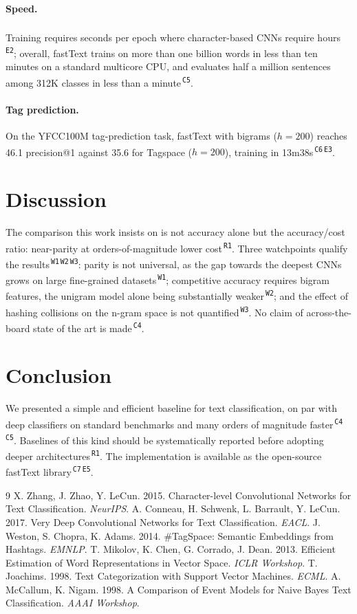 \documentclass[10pt,twocolumn]{article}
\newcommand{\anch}[1]{\textsuperscript{\,\textcolor{anchor}{\tiny\texttt{#1}}}}
\begin{document}
\paragraph{Speed.}
Training requires seconds per epoch where character-based CNNs require hours\anch{E2}; overall, fastText trains on more than one billion words in less than ten minutes on a standard multicore CPU, and evaluates half a million sentences among 312K classes in less than a minute\anch{C5}.

\paragraph{Tag prediction.}
On the YFCC100M tag-prediction task, fastText with bigrams ($h{=}200$) reaches 46.1 precision@1 against 35.6 for Tagspace ($h{=}200$), training in 13m38s\anch{C6}\anch{E3}.

\section{Discussion}
The comparison this work insists on is not accuracy alone but the accuracy/cost ratio: near-parity at orders-of-magnitude lower cost\anch{R1}. Three watchpoints qualify the results\anch{W1}\anch{W2}\anch{W3}: parity is not universal, as the gap towards the deepest CNNs grows on large fine-grained datasets\anch{W1}; competitive accuracy requires bigram features, the unigram model alone being substantially weaker\anch{W2}; and the effect of hashing collisions on the n-gram space is not quantified\anch{W3}. No claim of across-the-board state of the art is made\anch{C4}.

\section{Conclusion}
We presented a simple and efficient baseline for text classification, on par with deep classifiers on standard benchmarks and many orders of magnitude faster\anch{C4}\anch{C5}. Baselines of this kind should be systematically reported before adopting deeper architectures\anch{R1}. The implementation is available as the open-source fastText library\anch{C7}\anch{E5}.

\begin{thebibliography}{9}\small
{} X. Zhang, J. Zhao, Y. LeCun. 2015. Character-level Convolutional Networks for Text Classification. \emph{NeurIPS}.
 A. Conneau, H. Schwenk, L. Barrault, Y. LeCun. 2017. Very Deep Convolutional Networks for Text Classification. \emph{EACL}.
 J. Weston, S. Chopra, K. Adams. 2014. \#TagSpace: Semantic Embeddings from Hashtags. \emph{EMNLP}.
 T. Mikolov, K. Chen, G. Corrado, J. Dean. 2013. Efficient Estimation of Word Representations in Vector Space. \emph{ICLR Workshop}.
 T. Joachims. 1998. Text Categorization with Support Vector Machines. \emph{ECML}.
 A. McCallum, K. Nigam. 1998. A Comparison of Event Models for Naive Bayes Text Classification. \emph{AAAI Workshop}.
\end{thebibliography}
\end{document}
